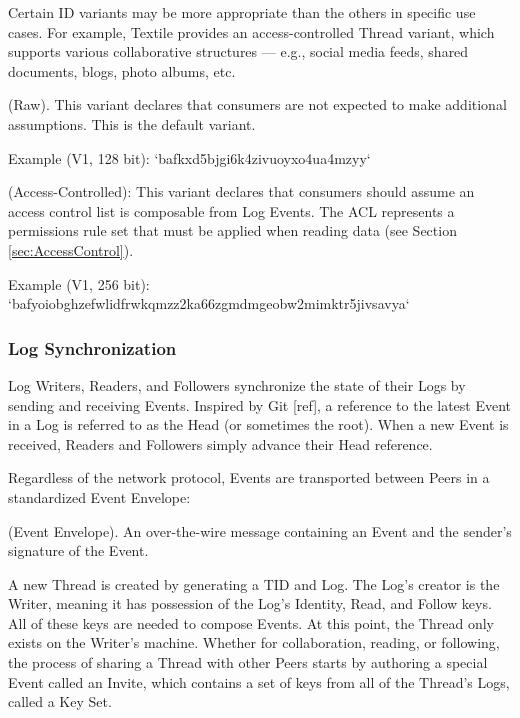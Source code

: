 \documentclass{comjnl}
\begin{document}
Certain ID variants may be more appropriate than the others in specific use cases. For example, Textile provides an access-controlled Thread variant, which supports various collaborative structures — e.g., social media feeds, shared documents, blogs, photo albums, etc.


\begin{definition}
(Raw). This variant declares that consumers are not expected to make additional assumptions. This is the default variant. 
\end{definition}

Example (V1, 128 bit): `bafkxd5bjgi6k4zivuoyxo4ua4mzyy`


\begin{definition}
(Access-Controlled): This variant declares that consumers should assume an access control list is composable from Log Events. The ACL represents a permissions rule set that must be applied when reading data (see Section  \ref{sec:AccessControl}).
\end{definition}

Example (V1, 256 bit): `bafyoiobghzefwlidfrwkqmzz2ka66zgmdmgeobw2mimktr5jivsavya`

\subsubsection{Log Synchronization} \label{sec:LogSync}

Log Writers, Readers, and Followers synchronize the state of their Logs by sending and receiving Events. Inspired by Git [ref], a reference to the latest Event in a Log is referred to as the Head (or sometimes the root). When a new Event is received, Readers and Followers simply advance their Head reference.

Regardless of the network protocol, Events are transported between Peers in a standardized Event Envelope:

\begin{definition}
(Event Envelope). An over-the-wire message containing an Event and the sender’s signature of the Event.
\end{definition}

A new Thread is created by generating a TID and Log. The Log’s creator is the Writer, meaning it has possession of the Log’s Identity, Read, and Follow keys. All of these keys are needed to compose Events. At this point, the Thread only exists on the Writer’s machine. Whether for collaboration, reading, or following, the process of sharing a Thread with other Peers starts by authoring a special Event called an Invite, which contains a set of keys from all of the Thread’s Logs, called a Key Set.
\end{document}
